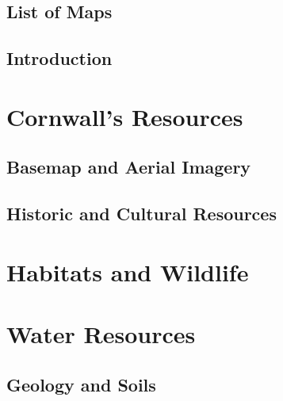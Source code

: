\documentclass[11pt,fleqn, openany]{book} %
\begin{document}
\chapter{List of Maps}\label{sec:listofmaps}


\pagebreak


\chapter{Introduction}\label{sec:intro}


\pagebreak

\part{Cornwall's Resources}

\chapter{Basemap and Aerial Imagery}\label{sec:basemap}


\chapter{Historic and Cultural Resources}\label{sec:historic}


\part{Habitats and Wildlife}\label{sec:habitats}


\part{Water Resources}\label{sec:water}


\chapter{Geology and Soils}\label{sec:geology}

\end{document}
